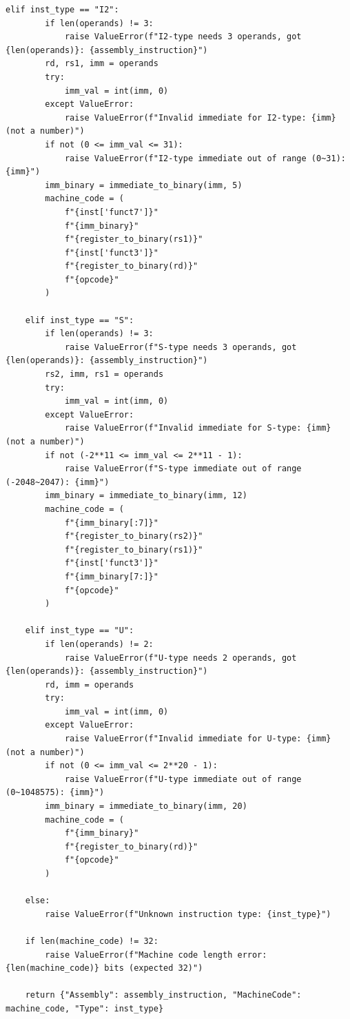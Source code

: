 \documentclass[11pt]{article}
\begin{document}
\begin{lstlisting}[style=mypython, caption=The Assembler Code, label=lst:assembler]
    elif inst_type == "I2":
        if len(operands) != 3:
            raise ValueError(f"I2-type needs 3 operands, got {len(operands)}: {assembly_instruction}")
        rd, rs1, imm = operands
        try:
            imm_val = int(imm, 0)
        except ValueError:
            raise ValueError(f"Invalid immediate for I2-type: {imm} (not a number)")
        if not (0 <= imm_val <= 31):
            raise ValueError(f"I2-type immediate out of range (0~31): {imm}")
        imm_binary = immediate_to_binary(imm, 5)
        machine_code = (
            f"{inst['funct7']}"
            f"{imm_binary}"
            f"{register_to_binary(rs1)}"
            f"{inst['funct3']}"
            f"{register_to_binary(rd)}"
            f"{opcode}"
        )

    elif inst_type == "S":
        if len(operands) != 3:
            raise ValueError(f"S-type needs 3 operands, got {len(operands)}: {assembly_instruction}")
        rs2, imm, rs1 = operands
        try:
            imm_val = int(imm, 0)
        except ValueError:
            raise ValueError(f"Invalid immediate for S-type: {imm} (not a number)")
        if not (-2**11 <= imm_val <= 2**11 - 1):
            raise ValueError(f"S-type immediate out of range (-2048~2047): {imm}")
        imm_binary = immediate_to_binary(imm, 12)
        machine_code = (
            f"{imm_binary[:7]}"
            f"{register_to_binary(rs2)}"
            f"{register_to_binary(rs1)}"
            f"{inst['funct3']}"
            f"{imm_binary[7:]}"
            f"{opcode}"
        )

    elif inst_type == "U":
        if len(operands) != 2:
            raise ValueError(f"U-type needs 2 operands, got {len(operands)}: {assembly_instruction}")
        rd, imm = operands
        try:
            imm_val = int(imm, 0)
        except ValueError:
            raise ValueError(f"Invalid immediate for U-type: {imm} (not a number)")
        if not (0 <= imm_val <= 2**20 - 1):
            raise ValueError(f"U-type immediate out of range (0~1048575): {imm}")
        imm_binary = immediate_to_binary(imm, 20)
        machine_code = (
            f"{imm_binary}"
            f"{register_to_binary(rd)}"
            f"{opcode}"
        )

    else:
        raise ValueError(f"Unknown instruction type: {inst_type}")

    if len(machine_code) != 32:
        raise ValueError(f"Machine code length error: {len(machine_code)} bits (expected 32)")

    return {"Assembly": assembly_instruction, "MachineCode": machine_code, "Type": inst_type}


\end{lstlisting}
\end{document}
